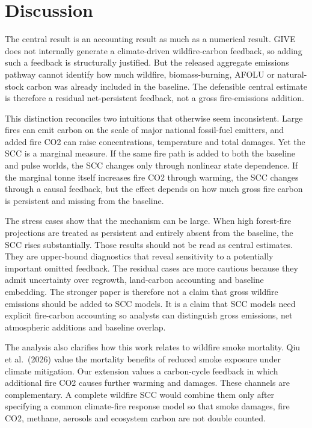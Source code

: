 \documentclass[12pt]{article}
\begin{document}
\section{Discussion}\label{discussion}

The central result is an accounting result as much as a numerical
result. GIVE does not internally generate a climate-driven
wildfire-carbon feedback, so adding such a feedback is structurally
justified. But the released aggregate emissions pathway cannot identify
how much wildfire, biomass-burning, AFOLU or natural-stock carbon was
already included in the baseline. The defensible central estimate is
therefore a residual net-persistent feedback, not a gross fire-emissions
addition.

This distinction reconciles two intuitions that otherwise seem
inconsistent. Large fires can emit carbon on the scale of major national
fossil-fuel emitters, and added fire CO2 can raise concentrations,
temperature and total damages. Yet the SCC is a marginal measure. If the
same fire path is added to both the baseline and pulse worlds, the SCC
changes only through nonlinear state dependence. If the marginal tonne
itself increases fire CO2 through warming, the SCC changes through a
causal feedback, but the effect depends on how much gross fire carbon is
persistent and missing from the baseline.

The stress cases show that the mechanism can be large. When high
forest-fire projections are treated as persistent and entirely absent
from the baseline, the SCC rises substantially. Those results should not
be read as central estimates. They are upper-bound diagnostics that
reveal sensitivity to a potentially important omitted feedback. The
residual cases are more cautious because they admit uncertainty over
regrowth, land-carbon accounting and baseline embedding. The stronger
paper is therefore not a claim that gross wildfire emissions should be
added to SCC models. It is a claim that SCC models need explicit
fire-carbon accounting so analysts can distinguish gross emissions, net
atmospheric additions and baseline overlap.

The analysis also clarifies how this work relates to wildfire smoke
mortality. Qiu et al.~(2026) value the mortality benefits of reduced
smoke exposure under climate mitigation. Our extension values a
carbon-cycle feedback in which additional fire CO2 causes further
warming and damages. These channels are complementary. A complete
wildfire SCC would combine them only after specifying a common
climate-fire response model so that smoke damages, fire CO2, methane,
aerosols and ecosystem carbon are not double counted.
\end{document}
